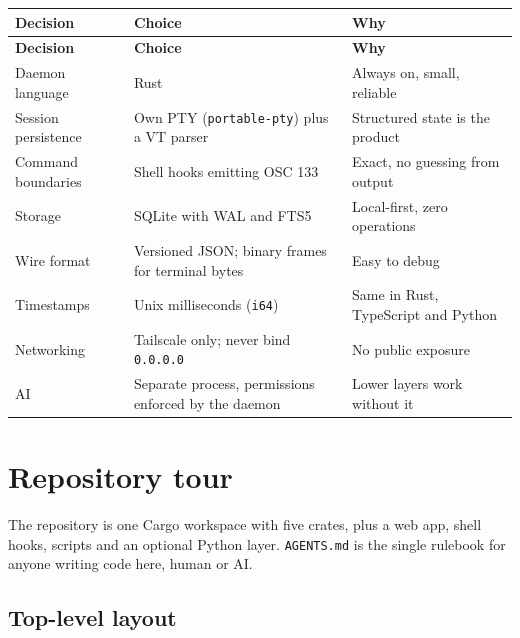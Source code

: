 \begin{small}
\begin{longtable}{>{\raggedright\arraybackslash}p{0.205\dimexpr \linewidth-6\tabcolsep\relax}>{\raggedright\arraybackslash}p{0.460\dimexpr \linewidth-6\tabcolsep\relax}>{\raggedright\arraybackslash}p{0.335\dimexpr \linewidth-6\tabcolsep\relax}}
\toprule
\textbf{Decision} & \textbf{Choice} & \textbf{Why} \\
\midrule
\endfirsthead
\toprule
\textbf{Decision} & \textbf{Choice} & \textbf{Why} \\
\midrule
\endhead
Daemon language & Rust & Always on, small, reliable \\
Session persistence & Own PTY (\texttt{portable-{}\allowbreak{}pty}) plus a VT parser & Structured state is the product \\
Command boundaries & Shell hooks emitting OSC 133 & Exact, no guessing from output \\
Storage & SQLite with WAL and FTS5 & Local-first, zero operations \\
Wire format & Versioned JSON; binary frames for terminal bytes & Easy to debug \\
Timestamps & Unix milliseconds (\texttt{i64}) & Same in Rust, TypeScript and Python \\
Networking & Tailscale only; never bind \texttt{0.\allowbreak{}0.\allowbreak{}0.\allowbreak{}0} & No public exposure \\
AI & Separate process, permissions enforced by the daemon & Lower layers work without it \\
\bottomrule
\end{longtable}
\end{small}

\chapter{\texorpdfstring{Repository tour}{Repository tour}}

The repository is one Cargo workspace with five crates, plus a web app, shell hooks, scripts and an optional Python layer. \texttt{AGENTS.\allowbreak{}md} is the single rulebook for anyone writing code here, human or AI.

\section{\texorpdfstring{Top-level layout}{Top-level layout}}

